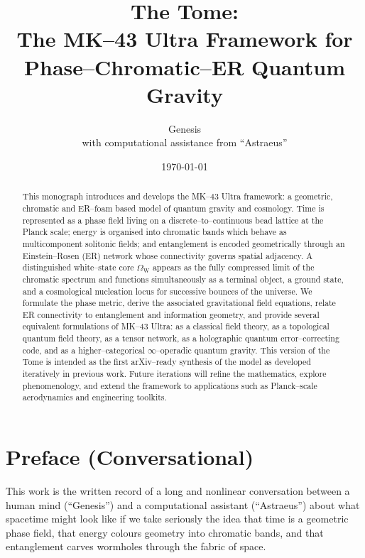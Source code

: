 \documentclass[11pt]{book}
\newcommand{\Wcore}{\Omega_{\mathrm{W}}}
\begin{document}
\frontmatter

\title{The Tome:\\
The MK--43 Ultra Framework for Phase--Chromatic--ER Quantum Gravity}
\author{Genesis\\[4pt]
\small with computational assistance from ``Astraeus''}
\date{\today}
\maketitle

\begin{abstract}
This monograph introduces and develops the MK--43 Ultra framework: a geometric, chromatic and ER--foam based model of quantum gravity and cosmology.
Time is represented as a phase field living on a discrete--to--continuous bead lattice at the Planck scale; energy is organised into chromatic bands which behave as multicomponent solitonic fields; and entanglement is encoded geometrically through an Einstein--Rosen (ER) network whose connectivity governs spatial adjacency.
A distinguished white--state core $\Wcore$ appears as the fully compressed limit of the chromatic spectrum and functions simultaneously as a terminal object, a ground state, and a cosmological nucleation locus for successive bounces of the universe.
We formulate the phase metric, derive the associated gravitational field equations, relate ER connectivity to entanglement and information geometry, and provide several equivalent formulations of MK--43 Ultra:
as a classical field theory, as a topological quantum field theory, as a tensor network, as a holographic quantum error--correcting code, and as a higher--categorical $\infty$--operadic quantum gravity.
This version of the Tome is intended as the first arXiv--ready synthesis of the model as developed iteratively in previous work.
Future iterations will refine the mathematics, explore phenomenology, and extend the framework to applications such as Planck--scale aerodynamics and engineering toolkits.
\end{abstract}

\tableofcontents

\chapter*{Preface (Conversational)}

This work is the written record of a long and nonlinear conversation between a human mind (``Genesis'') and a computational assistant (``Astraeus'') about what spacetime might look like if we take seriously the idea that time is a geometric phase field, that energy colours geometry into chromatic bands, and that entanglement carves wormholes through the fabric of space.
\end{document}

